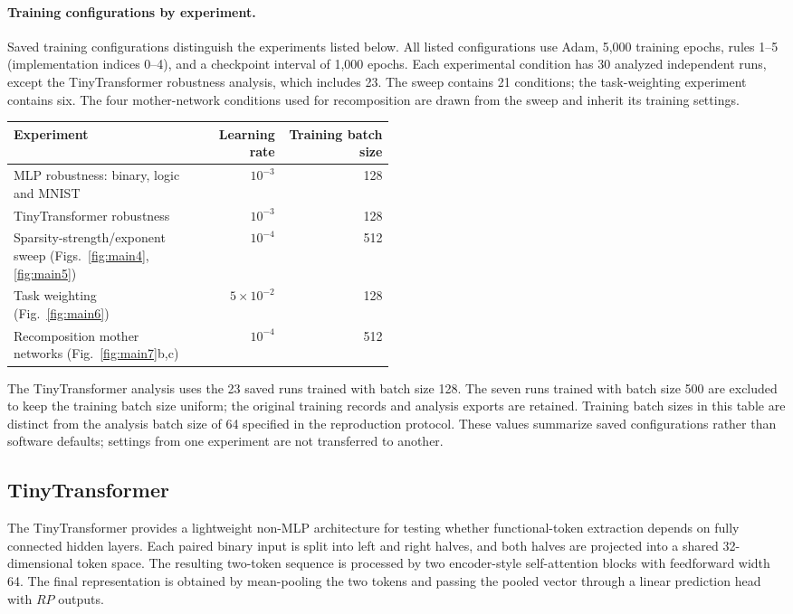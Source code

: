 \documentclass{article}
\begin{document}
\paragraph{Training configurations by experiment.}
Saved training configurations distinguish the experiments listed below. All listed configurations use Adam, 5,000 training epochs, rules 1--5 (implementation indices 0--4), and a checkpoint interval of 1,000 epochs. Each experimental condition has 30 analyzed independent runs, except the TinyTransformer robustness analysis, which includes 23. The sweep contains 21 conditions; the task-weighting experiment contains six. The four mother-network conditions used for recomposition are drawn from the sweep and inherit its training settings.
\begin{center}
\small
\begin{tabular}{p{0.49\linewidth}rr}
\toprule
Experiment & Learning rate & Training batch size \\
\midrule
MLP robustness: binary, logic and MNIST & $10^{-3}$ & 128 \\
TinyTransformer robustness & $10^{-3}$ & 128 \\
Sparsity-strength/exponent sweep (Figs.~\ref{fig:main4}, \ref{fig:main5}) & $10^{-4}$ & 512 \\
Task weighting (Fig.~\ref{fig:main6}) & $5\times10^{-2}$ & 128 \\
Recomposition mother networks (Fig.~\ref{fig:main7}b,c) & $10^{-4}$ & 512 \\
\bottomrule
\end{tabular}
\end{center}
The TinyTransformer analysis uses the 23 saved runs trained with batch size 128. The seven runs trained with batch size 500 are excluded to keep the training batch size uniform; the original training records and analysis exports are retained. Training batch sizes in this table are distinct from the analysis batch size of 64 specified in the reproduction protocol. These values summarize saved configurations rather than software defaults; settings from one experiment are not transferred to another.

\subsection{TinyTransformer}

The TinyTransformer provides a lightweight non-MLP architecture for testing whether functional-token extraction depends on fully connected hidden layers. Each paired binary input is split into left and right halves, and both halves are projected into a shared 32-dimensional token space. The resulting two-token sequence is processed by two encoder-style self-attention blocks with feedforward width 64. The final representation is obtained by mean-pooling the two tokens and passing the pooled vector through a linear prediction head with $RP$ outputs.
\end{document}
